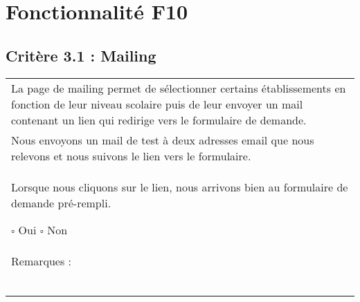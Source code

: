   		
\section{Fonctionnalité F10}
\subsection*{Critère 3.1 : Mailing }
  		\begin{center}
    	 		\begin{tabular}[h]{|p{}|}
			\hline
				La page de mailing permet de sélectionner certains établissements en fonction de leur niveau scolaire puis de leur envoyer un mail contenant un lien qui redirige vers le formulaire de demande. \\
				Nous envoyons un mail de test à deux adresses email que nous relevons et nous suivons le lien vers le formulaire. \\
				Lorsque nous cliquons sur le lien, nous arrivons bien au formulaire de demande pré-rempli.
				
				$\square$ Oui  \hfill \hfill $\square$ Non \\\hline Remarques : \\ ~\\
			 \\\hline
     		\end{tabular}
  		\end{center}	
